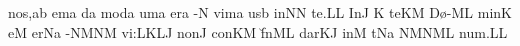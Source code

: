 \spatium
\sgn no{s,}\punctum a\augmentum b\egn
\spatium\divisiominor\spatium
{}em\punctum a\egn
\sgn {}{\a}d\punctum a\egn
\sgn mod\punctum a\egn
\sgn {}um\punctum a\egn
\spatium
{}er\punctum a\egn
\sgn {}{\a}-\punctum N\egn
\sgn vim\punctum a\egn
\sgn {}us\punctum b\egn
\spatium
\sgn {}in\punctum N\augmentum N\egn
\spatium\sgn te.\punctum L\augmentum L\egn
\spatium\divisiofinalis\spatium
\sgn {}In\punctum J\egn
\spatium
\custos K
\lineaproxima
\sgn te{}\pes KM\egn
\spatium
\sgn D{\o}-\clivis ML\egn
\sgn min\punctum K\egn
\sgn {}e{}\punctum M\egn
\spatium
{}er\pes Na\egn
\sgn {}{\a}-\clivis NM\clivis NM\egn
\sgn vi:\clivis LK\augmentumduplex LJ\egn
\spatium\divisiominor\spatium
\sgn non\punctum J\egn
\spatium\sgn con\pes KM\egn
\sgn f{\u}n\clivis ML\egn
\sgn dar\clivis KJ\egn
\spatium
\sgn {}in\punctum M\egn
\spatium
\sgn {}{\ae}t\pes Na\egn
{}\engl{}\clivis NM\climacus NML\egn
\sgn nu{m.}\punctum L\augmentum L\egn
\spatium
\Finisgregoriana


